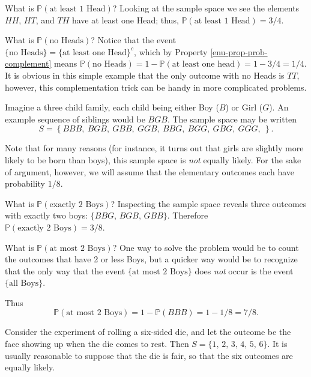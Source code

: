 \documentclass[]{book}
\numberwithin{equation}{chapter}
\numberwithin{figure}{chapter}
\theoremstyle{plain}
\theoremstyle{definition}
\theoremstyle{remark}
\theoremstyle{definition}
\theoremstyle{definition}
\theoremstyle{remark}
\let\BeginKnitrBlock\begin \let\EndKnitrBlock\end
\begin{document}
What is \(\mathbb{P}(\mbox{at least 1 Head})\)? Looking at the sample
space we see the elements \(HH\), \(HT\), and \(TH\) have at least one
Head; thus, \(\mathbb{P}(\mbox{at least 1 Head})=3/4\).

What is \(\mathbb{P}(\mbox{no Heads})\)? Notice that the event
\(\{ \mbox{no Heads} \} = \{ \mbox{at least one Head} \} ^{c}\), which
by Property \ref{enu-prop-prob-complement} means
\(\mathbb{P}(\mbox{no Heads})=1-\mathbb{P}(\mbox{at least one head})=1-3/4=1/4\).
It is obvious in this simple example that the only outcome with no Heads
is \(TT\), however, this complementation trick can be handy in more
complicated problems.

\bigskip

\BeginKnitrBlock{example}
\protect\hypertarget{ex:three-child-family}{}{\label{ex:three-child-family}}Imagine
a three child family, each child being either Boy (\(B\)) or Girl
(\(G\)). An example sequence of siblings would be \(BGB\). The sample
space may be written \[ S =
\left\{ BBB,\ BGB,\ GBB,\ GGB,\ BBG,\ BGG,\ GBG,\ GGG,\ \right\}.\]
\EndKnitrBlock{example}

Note that for many reasons (for instance, it turns out that girls are
slightly more likely to be born than boys), this sample space is
\emph{not} equally likely. For the sake of argument, however, we will
assume that the elementary outcomes each have probability \(1/8\).

What is \(\mathbb{P}(\mbox{exactly 2 Boys})\)? Inspecting the sample
space reveals three outcomes with exactly two boys:
\(\{ BBG,\, BGB,\, GBB \}\). Therefore
\(\mathbb{P}(\mbox{exactly 2 Boys}) = 3/8\).

What is \(\mathbb{P}(\mbox{at most 2 Boys})\)? One way to solve the
problem would be to count the outcomes that have 2 or less Boys, but a
quicker way would be to recognize that the only way that the event
\(\{ \mbox{at most 2 Boys} \}\) does \emph{not} occur is the event
\(\{ \mbox{all Boys} \}\).

Thus \[ \mathbb{P}(\mbox{at most 2 Boys}) = 1 - \mathbb{P}(BBB) = 1 -
1/8 = 7/8. \]

\bigskip

\BeginKnitrBlock{example}
\protect\hypertarget{ex:unnamed-chunk-124}{}{\label{ex:unnamed-chunk-124}}Consider
the experiment of rolling a six-sided die, and let the outcome be the
face showing up when the die comes to rest. Then
\(S = \{ 1,\,2,\,3,\,4,\,5,\,6 \}\). It is usually reasonable to suppose
that the die is fair, so that the six outcomes are equally likely.
\EndKnitrBlock{example}
\end{document}
